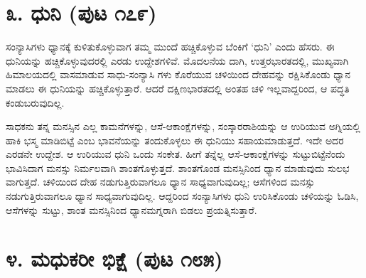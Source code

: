 \section{೩. ಧುನಿ (ಪುಟ ೧೭೯)}

ಸಂನ್ಯಾಸಿಗಳು ಧ್ಯಾನಕ್ಕೆ ಕುಳಿತುಕೊಳ್ಳುವಾಗ ತಮ್ಮ ಮುಂದೆ ಹಚ್ಚಿಕೊಳ್ಳುವ ಬೆಂಕಿಗೆ ‘ಧುನಿ’ ಎಂದು ಹೆಸರು. ಈ ಧುನಿಯನ್ನು ಹಚ್ಚಿಕೊಳ್ಳುವುದರಲ್ಲಿ ಎರಡು ಉದ್ದೇಶಗಳಿವೆ. ಮೊದಲನೆಯ ದಾಗಿ, ಉತ್ತರಭಾರತದಲ್ಲಿ, ಮುಖ್ಯವಾಗಿ ಹಿಮಾಲಯದಲ್ಲಿ ವಾಸಮಾಡುವ ಸಾಧು-ಸಂನ್ಯಾಸಿ ಗಳು ಕೊರೆಯುವ ಚಳಿಯಿಂದ ದೇಹವನ್ನು ರಕ್ಷಿಸಿಕೊಂಡು ಧ್ಯಾನ ಮಾಡಲು ಈ ಧುನಿಯನ್ನು ಹಚ್ಚಿಕೊಳ್ಳುತ್ತಾರೆ. ಆದರೆ ದಕ್ಷಿಣಭಾರತದಲ್ಲಿ ಅಂತಹ ಚಳಿ ಇಲ್ಲವಾದ್ದರಿಂದ, ಆ ಪದ್ಧತಿ ಕಂಡುಬರುವುದಿಲ್ಲ.

ಸಾಧಕನು ತನ್ನ ಮನಸ್ಸಿನ ಎಲ್ಲ ಕಾಮನೆಗಳನ್ನು, ಆಸೆ-ಆಕಾಂಕ್ಷೆಗಳನ್ನು, ಸಂಸ್ಕಾರರಾಶಿಯನ್ನು ಆ ಉರಿಯುವ ಅಗ್ನಿಯಲ್ಲಿ ಹಾಕಿ ಭಸ್ಮ ಮಾಡಿಬಿಟ್ಟೆ ಎಂಬ ಭಾವನೆಯನ್ನು ತಂದುಕೊಳ್ಳಲು ಈ ಧುನಿಯು ಸಹಾಯಮಾಡುತ್ತದೆ. ಇದೇ ಅದರ ಎರಡನೇ ಉದ್ದೇಶ. ಆ ಉರಿಯುವ ಧುನಿ ಒಂದು ಸಂಕೇತ. ಹೀಗೆ ತನ್ನೆಲ್ಲ ಆಸೆ-ಆಕಾಂಕ್ಷೆಗಳನ್ನು ಸುಟ್ಟುಬಿಟ್ಟೆನೆಂದು ಭಾವಿಸಿದಾಗ ಮನಸ್ಸು ನಿರ್ಮಲವಾಗಿ ಶಾಂತಗೊಳ್ಳುತ್ತದೆ. ಶಾಂತಗೊಂಡ ಮನಸ್ಸಿನಿಂದ ಧ್ಯಾನ ಮಾಡುವುದು ಸುಲಭ ವಾಗುತ್ತದೆ. ಚಳಿಯಿಂದ ದೇಹ ನಡುಗುತ್ತಿರುವಾಗಲೂ ಧ್ಯಾನ ಸಾಧ್ಯವಾಗುವುದಿಲ್ಲ; ಆಸೆಗಳಿಂದ ಮನಸ್ಸು ನಡುಗುತ್ತಿರುವಾಗಲೂ ಧ್ಯಾನ ಸಾಧ್ಯವಾಗುವುದಿಲ್ಲ. ಆದ್ದರಿಂದ ಸಂನ್ಯಾಸಿಗಳು ಧುನಿ ಉರಿಸಿಕೊಂಡು ಚಳಿಯನ್ನು ಓಡಿಸಿ, ಆಸೆಗಳನ್ನು ಸುಟ್ಟು, ಶಾಂತ ಮನಸ್ಸಿನಿಂದ ಧ್ಯಾನಮಗ್ನರಾಗಿ ಬಿಡಲು ಪ್ರಯತ್ನಿಸುತ್ತಾರೆ.


\section{೪. ಮಧುಕರೀ ಭಿಕ್ಷೆ (ಪುಟ ೧೮೫)}

